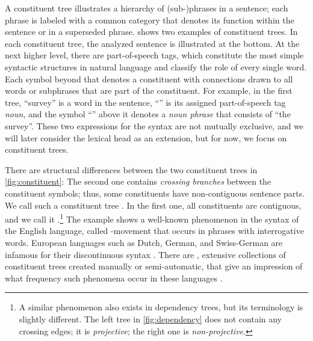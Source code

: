 \documentclass[../document.tex]{subfiles}
\begin{document}
    A constituent tree illustrates a hierarchy of (sub-)phrases in a sentence; each phrase is labeled with a common category that denotes its function within the sentence or in a superseded phrase.
     shows two examples of constituent trees.
    In each constituent tree, the analyzed sentence is illustrated at the bottom.
    At the next higher level, there are part-of-speech tags, which constitute the most simple syntactic structures in natural language and classify the role of every single word.
    Each symbol beyond that denotes a constituent with connections drawn to all words or subphrases that are part of the constituent.
    For example, in the first tree, ``survey'' is a word in the sentence, ``'' is its assigned part-of-speech tag \emph{noun}, and the symbol ``'' above it denotes a \emph{noun phrase} that consists of ``the survey''.
    These two expressions for the syntax are not mutually exclusive, and we will later consider the lexical head as an extension, but for now, we focus on constituent trees.

    There are structural differences between the two constituent trees in \cref{fig:constituent}:
        The second one contains \emph{crossing branches} between the constituent symbols; thus, some constituents have non-contiguous sentence parts.
    We call such a constituent tree .
    In the first one, all constituents are contiguous, and we call it .\footnote{
        A similar phenomenon also exists in dependency trees, but its terminology is slightly different.
        The left tree in \cref{fig:dependency} does not contain any crossing edges; it is \emph{projective}; the right one is \emph{non-projective}.
    }
    The example shows a well-known phenomenon in the syntax of the English language, called -movement that occurs in phrases with interrogative words.
    European languages such as Dutch, German, and Swiss-German are infamous for their discontinuous syntax \citep{Shieber85,Becker91}.
    There are , extensive collections of constituent trees created manually or semi-automatic, that give an impression of what frequency such phenomena occur in these languages \citep{Marcus94,EvaKal11,Skut98,Brants04,Noo13}.
\end{document}
